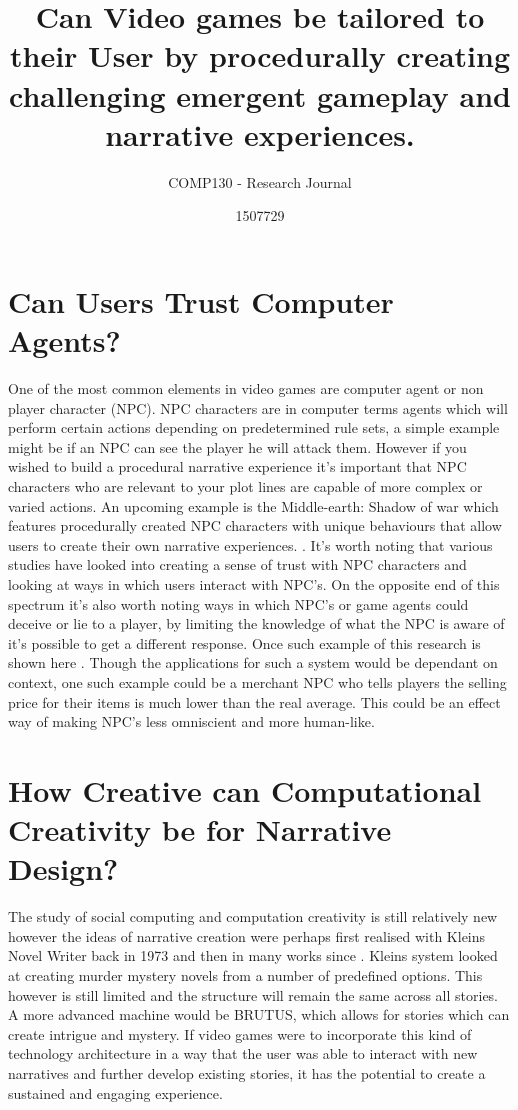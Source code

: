 \documentclass{scrartcl}
\title{Can Video games be tailored to their User by procedurally creating challenging emergent gameplay and narrative experiences.}
\subtitle{COMP130 - Research Journal}
\author{1507729}
\begin{document}
\maketitle

\abstract{}

\section{Can Users Trust Computer Agents?}

One of the most common elements in video games are computer agent or non player character (NPC). NPC characters are in computer terms agents which will perform certain actions depending on predetermined rule sets, a simple example might be if an NPC can see the player he will attack them. However if you wished to build a procedural narrative experience it's important that NPC characters who are relevant to your plot lines are capable of more complex or varied actions. An upcoming example is the Middle-earth: Shadow of war which features procedurally created NPC characters with unique behaviours that allow users to create their own narrative experiences. \cite{monolith2017shadow}. It's worth noting that various studies have looked into creating a sense of trust with NPC characters and looking at ways in which users interact with NPC's. \cite{do2016trust} \cite{granatyr2015trust} On the opposite end of this spectrum it's also worth noting ways in which NPC's or game agents could deceive or lie to a player, by limiting the knowledge of what the NPC is aware of it's possible to get a different response. Once such example of this research is shown here \cite{cowling2015emergent}. Though the applications for such a system would be dependant on context, one such example could be a merchant NPC who tells players the selling price for their items is much lower than the real average. This could be an effect way of making NPC's less omniscient and more human-like.

\section{How Creative can Computational Creativity be for Narrative Design?}

The study of social computing and computation creativity is still relatively new however the ideas of narrative creation were perhaps first realised with Kleins Novel Writer \cite{klein1973automatic} back in 1973 and then in many works since \cite{gervas2009storytelling}. Kleins system looked at creating murder mystery novels from a number of predefined options. This however is still limited and the structure will remain the same across all stories. A more advanced machine would be BRUTUS, \cite{bringsjord2000artificial} which allows for stories which can create intrigue and mystery. If video games were to incorporate this kind of technology architecture in a way that the user was able to interact with new narratives and further develop existing stories, it has the potential to create a sustained and engaging experience.
\end{document}
